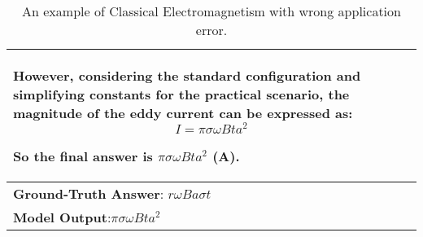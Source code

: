 \begin{table}[!t]
{\begin{tabular}{p{10cm}}
   However, considering the standard configuration and simplifying constants for the practical scenario, the magnitude of the eddy current can be expressed as:
   \[
   I = \pi \sigma \omega B t a^{2}
   \]

So the final answer is \( \boxed{\pi \sigma \omega B t a^{2}} \) (A).
\\
\midrule
\textbf{Ground-Truth Answer}: \(r \omega B a \sigma t\) \\

\midrule
\textbf{Model Output}:\( \pi \sigma \omega B t a^{2} \)\\
\bottomrule
\end{tabular}%
}
\caption{An example of Classical Electromagnetism with wrong application error.}
\label{tabapp:error example 3}
\end{table}


